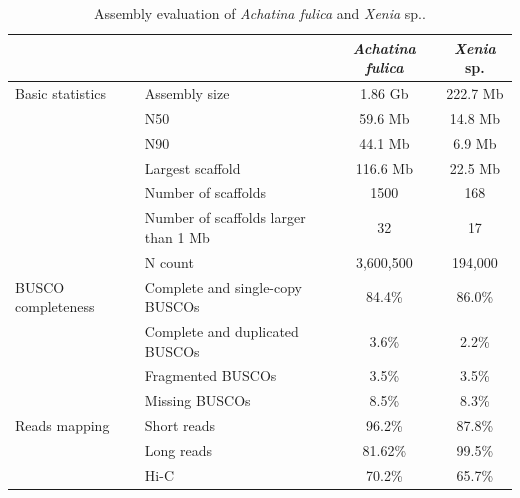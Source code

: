 \begin{table}
\centering
\caption{Assembly evaluation of \textit{Achatina fulica} and \textit{Xenia} sp..}
\begin{tabular}{|l|l|c|c|}
\hline
                &  & \textit{Achatina fulica} & \textit{Xenia} sp. \\
\hline
Basic statistics & Assembly size & 1.86 Gb & 222.7 Mb \\
                & N50 & 59.6 Mb & 14.8 Mb \\
                & N90 & 44.1 Mb & 6.9 Mb \\
                & Largest scaffold & 116.6 Mb & 22.5 Mb \\
                & Number of scaffolds & 1500 & 168 \\
                & Number of scaffolds larger than 1 Mb & 32 & 17 \\
                & N count & 3,600,500 & 194,000 \\
\hline
BUSCO completeness & Complete and single-copy BUSCOs & 84.4\% & 86.0\% \\
                & Complete and duplicated BUSCOs & 3.6\% & 2.2\% \\
                & Fragmented BUSCOs & 3.5\% & 3.5\% \\
                & Missing BUSCOs & 8.5\% & 8.3\% \\
\hline
Reads mapping & Short reads & 96.2\% & 87.8\% \\
                & Long reads & 81.62\% & 99.5\% \\
                & Hi-C & 70.2\% & 65.7\% \\
\hline
\end{tabular}
\label{tab:assembly_stats}
\end{table}


